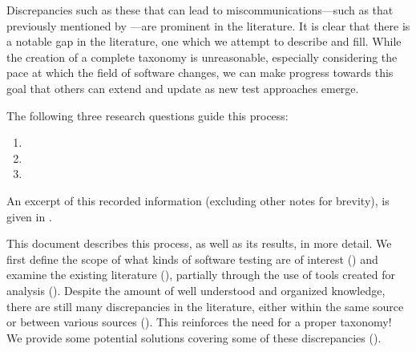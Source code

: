 Discrepancies such as these that can lead to miscommunications---such as that
previously mentioned by \citet[p.~7]{KanerEtAl2011}---are prominent in the
literature. \expBasedCatMain{} \tourDiscrep{} \loadDiscrep{} \alphaDiscrep{}
It is clear that there is a notable gap in the literature, one which we
attempt to describe and fill. While the creation of a complete taxonomy is
unreasonable, especially considering the pace at which the field of software
changes, we can make progress towards this goal that others can extend and
update as new test approaches emerge.

\ifnotpaper
    The following three research questions guide this process:
    \begin{enumerate}
        \item \rqatext{}
        \item \rqbtext{}
        \item \rqctext{}
    \end{enumerate}
    
    An excerpt of this recorded information (excluding other notes for brevity),
    is given in .
\fi

This document describes this process, as well as its results, in more detail.
We first define the scope of
what kinds of software testing are of interest () and examine the
existing literature ()\ifnotpaper, partially through the use
of tools created for analysis ()\fi. Despite the amount of well
understood and organized knowledge, there are still many discrepancies in the
literature, either within the same source or between various
sources (). This reinforces the need for a proper taxonomy! We
provide some potential solutions covering some of these discrepancies
().

\ifnotpaper
    \begin{landscape}
        
    \end{landscape}
\fi